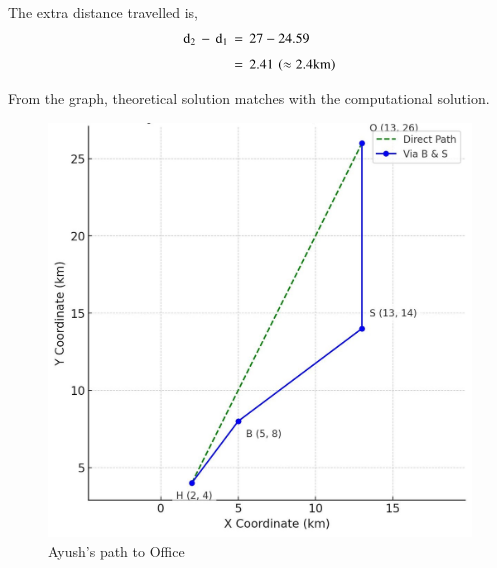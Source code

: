 \documentclass[journal,12pt,onecolumn]{IEEEtran}
\theoremstyle{remark}
\begin{document}
The extra distance travelled is,
\begin{align}
    \text{d}_2\,-\,\text{d}_1\,&=\,27-24.59\\[4pt]
    \,&=\,2.41\,\left(\approx2.4\text{km}\right)
\end{align}

\newpage
From the graph, theoretical solution matches with the computational solution.

\begin{figure}[H]
\centering
\includegraphics[width=0.7\columnwidth]{figs/graph.png}
 \caption*{Ayush's path to Office}
\label{fig:graph.png}
\end{figure}
\end{document}
